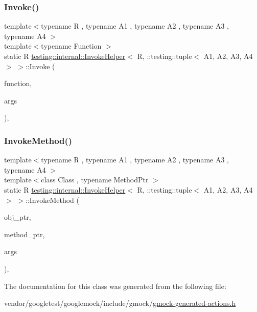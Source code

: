 \subsubsection{\texorpdfstring{Invoke()}{Invoke()}}
{\footnotesize\ttfamily template$<$typename R , typename A1 , typename A2 , typename A3 , typename A4 $>$ \\
template$<$typename Function $>$ \\
static R \hyperlink{classtesting_1_1internal_1_1_invoke_helper}{testing\+::internal\+::\+Invoke\+Helper}$<$ R, \+::testing\+::tuple$<$ A1, A2, A3, A4 $>$ $>$\+::Invoke (\begin{DoxyParamCaption}\item[{\hyperlink{structtesting_1_1internal_1_1_function}{Function}}]{function,  }\item[{const \+::testing\+::tuple$<$ A1, A2, A3, A4 $>$ \&}]{args }\end{DoxyParamCaption})\hspace{0.3cm}{\ttfamily [inline]}, {\ttfamily [static]}}

\mbox{\label{classtesting_1_1internal_1_1_invoke_helper_3_01_r_00_01_1_1testing_1_1tuple_3_01_a1_00_01_a2_00_01_a3_00_01_a4_01_4_01_4_ad523e518f7f633bdd9f8a14b7d55708f}} 
\subsubsection{\texorpdfstring{Invoke\+Method()}{InvokeMethod()}}
{\footnotesize\ttfamily template$<$typename R , typename A1 , typename A2 , typename A3 , typename A4 $>$ \\
template$<$class Class , typename Method\+Ptr $>$ \\
static R \hyperlink{classtesting_1_1internal_1_1_invoke_helper}{testing\+::internal\+::\+Invoke\+Helper}$<$ R, \+::testing\+::tuple$<$ A1, A2, A3, A4 $>$ $>$\+::Invoke\+Method (\begin{DoxyParamCaption}\item[{Class $\ast$}]{obj\+\_\+ptr,  }\item[{Method\+Ptr}]{method\+\_\+ptr,  }\item[{const \+::testing\+::tuple$<$ A1, A2, A3, A4 $>$ \&}]{args }\end{DoxyParamCaption})\hspace{0.3cm}{\ttfamily [inline]}, {\ttfamily [static]}}



The documentation for this class was generated from the following file\+:\begin{DoxyCompactItemize}
\item 
vendor/googletest/googlemock/include/gmock/\hyperlink{gmock-generated-actions_8h}{gmock-\/generated-\/actions.\+h}\end{DoxyCompactItemize}
